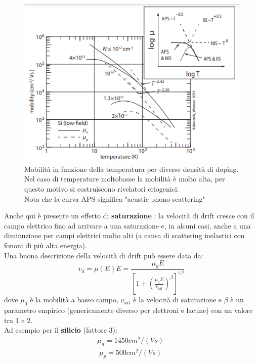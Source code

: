 \hspace{-30pt}
\begin{minipage}{0.55\textwidth}
    \vspace{-40pt}
    \begin{figure}[H]
        \centering
        \includegraphics[width=\textwidth,frame]{Chapters/images/Interazione_radiazione_materia/image-20220223184712151.png}
        \captionsetup{width=\textwidth}
        \caption{Mobilità in funzione della temperatura per diverse densità di doping. \\ Nel caso di temperature moltobasse la mobilità è molto alta, per questo motivo si costruiscono rivelatori criogenici.\\ Nota che la curva APS significa "acustic phono scattering"}
        \label{fig:}
    \end{figure}
\end{minipage} \hspace{5pt}
\begin{minipage}{0.5\textwidth}

    Anche qui è presente un effetto di \textbf{saturazione} : la velocità di drift cresce con il campo elettrico fino ad arrivare a una saturazione e, in alcuni casi, anche a una diminuzione per campi elettrici molto alti (a causa di scattering inelastici con fononi di più alta energia).\\ 
    Una buona descrizione della velocità di drift può essere data da:
    $$
    v_d=\mu(E) E =\frac{\mu_0 E}{[1+(\frac{\mu_0 E}{v_{\text{sat}}})^\beta]^{^{1/\beta}}}
    $$
    dove $\mu_0$ è la mobilità a basso campo, $v_{\text{sat}}$ è la velocità di saturazione e $\beta$ è un parametro empirico (genericamente diverso per elettroni e lacune) con un valore tra 1 e 2.\\
    Ad esempio per il \textbf{silicio} (fattore 3): \[\begin{gathered}
        \mu_n=1450 cm^2/(Vs) \; \\  \; \mu_p=500 cm^2/(Vs)
    \end{gathered}\] 
\\ \\ 
\end{minipage}
